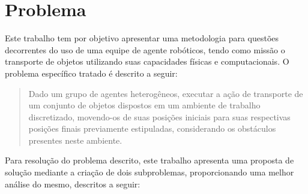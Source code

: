 %


\section{Problema} %
\label{sec:problema}

Este trabalho tem por objetivo apresentar uma metodologia para questões decorrentes do uso de uma equipe de agente robóticos, tendo como missão o transporte de objetos utilizando suas capacidades físicas e computacionais.
O problema específico tratado é descrito a seguir:

\begin{quotation}
Dado um grupo de agentes heterogêneos, executar a ação de transporte de um conjunto de objetos dispostos em um ambiente de trabalho discretizado, movendo-os de suas posições iniciais para suas respectivas posições finais previamente estipuladas, considerando os obstáculos presentes neste ambiente.
\end{quotation}

Para resolução do problema descrito, este trabalho apresenta uma proposta de solução mediante a criação de dois subproblemas, proporcionando uma melhor análise do mesmo, descritos a seguir:

